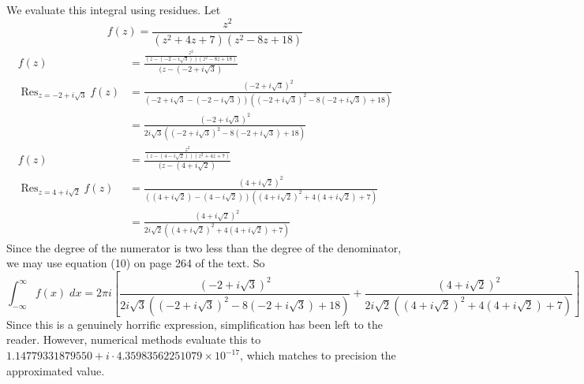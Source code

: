 \documentclass{article}
\theoremstyle{definition}
\DeclareMathOperator*{\Res}{Res}
\newcommand{\sq}[1]{\left[#1\right]}
\begin{document}
We evaluate this integral using residues. Let
\[
f(z) = \frac{z^2}{(z^2+4z+7)(z^2-8z+18)}
\]
\begin{align*}
f(z) &= \frac{\frac{z^2}{(z-(-2-i\sqrt{3}))(z^2-8z+18)}}{(z-(-2+i\sqrt{3})} \\
\Res_{z=-2+i\sqrt{3}} f(z) 
&= \frac{(-2+i\sqrt{3})^2}{(-2+i\sqrt{3}-(-2-i\sqrt{3}))((-2+i\sqrt{3})^2-8(-2+i\sqrt{3})+18)}\\
&= \frac{(-2+i\sqrt{3})^2}{2i\sqrt{3}((-2+i\sqrt{3})^2-8(-2+i\sqrt{3})+18)}\\
f(z) &= \frac{\frac{z^2}{(z-(4-i\sqrt{2}))(z^2+4z+7)}}{(z-(4+i\sqrt{2})} \\
\Res_{z=4+i\sqrt{2}} f(z) 
&= \frac{(4+i\sqrt{2})^2}{((4+i\sqrt{2})-(4-i\sqrt{2})) ( (4+i\sqrt{2})^2 + 4(4+i\sqrt{2}) +7)}\\
&= \frac{(4+i\sqrt{2})^2}{2i\sqrt{2} ( (4+i\sqrt{2})^2 + 4(4+i\sqrt{2}) +7)}
\end{align*}
Since the degree of the numerator is two less than the degree of the denominator,
we may use equation (10) on page 264 of the text. So
\[
\int_{-\infty}^\infty f(x) \;dx
= 2 \pi i \sq{
\frac{(-2+i\sqrt{3})^2}{2i\sqrt{3}((-2+i\sqrt{3})^2-8(-2+i\sqrt{3})+18)}
+
\frac{(4+i\sqrt{2})^2}{2i\sqrt{2} ( (4+i\sqrt{2})^2 + 4(4+i\sqrt{2}) +7)}
}
\]
Since this is a genuinely horrific expression, simplification has been left to the reader. 
However, numerical methods evaluate this to $1.14779331879550 + i \cdot 4.35983562251079 \times 10^{-17}$,
which matches to precision the approximated value.
\end{document}

